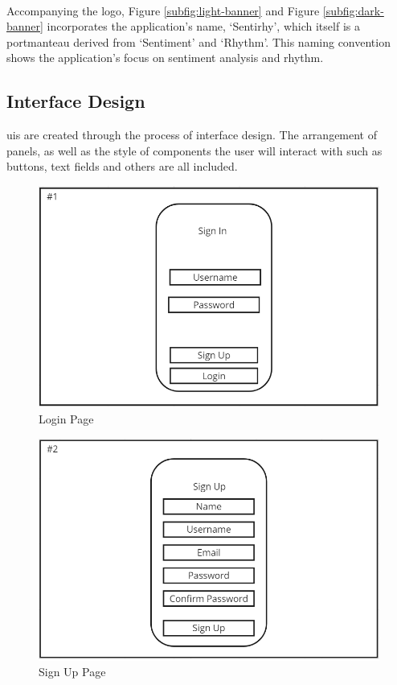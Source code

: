 \\
\indent Accompanying the logo, Figure \ref{subfig:light-banner} and Figure \ref{subfig:dark-banner} incorporates the application's name, `Sentirhy', which itself is a portmanteau derived from `Sentiment' and `Rhythm'.
This naming convention shows the application's focus on sentiment analysis and rhythm.
\\
\subsection{Interface Design}
\gls{ui}s are created through the process of interface design.
The arrangement of panels, as well as the style of components the user will interact with such as buttons, text fields and others are all included.
\begin{figure}[H]
    \centering
    \includegraphics[width=12cm]{Images/login.png}
    \caption{Login Page}
    \label{fig:login}
\end{figure}
\begin{figure}[H]
    \centering
    \includegraphics[width=12cm]{Images/signup.png}
    \caption{Sign Up Page}
    \label{fig:signup}
\end{figure}
